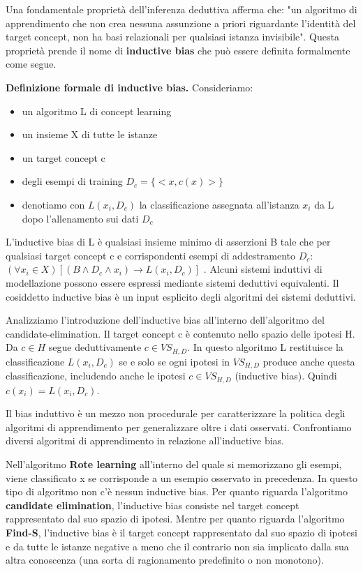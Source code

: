 \documentclass[a4paper]{extarticle}
\begin{document}
Una fondamentale proprietà dell'inferenza deduttiva afferma che: "un algoritmo di apprendimento che non crea nessuna assunzione a priori riguardante l'identità del target concept, non ha basi relazionali per qualsiasi istanza invisibile". Questa proprietà prende il nome di \textbf{inductive bias} che può essere definita formalmente come segue.

\textbf{Definizione formale di inductive bias.} Consideriamo:
\begin{itemize}
\item un algoritmo L di concept learning
\item un insieme X di tutte le istanze
\item un target concept c
\item degli esempi di training $D_c = \{ <x,c(x)>\}$
\item denotiamo con $L(x_i,D_c)$ la classificazione assegnata all'istanza $x_i$ da L dopo l'allenamento sui dati $D_c$
\end{itemize}

L'inductive bias di L è qualsiasi insieme minimo di asserzioni B tale che per qualsiasi target concept c e corrispondenti esempi di addestramento $D_c$: $(\forall x_i \in X) [( B \wedge D_c \wedge x_i ) \rightarrow L(x_i,D_c)]$ . Alcuni sistemi induttivi di modellazione possono essere espressi mediante sistemi deduttivi equivalenti. Il cosiddetto inductive bias è un input esplicito degli algoritmi dei sistemi deduttivi.

Analizziamo l'introduzione dell'inductive bias all'interno dell'algoritmo del candidate-elimination. Il target concept c è contenuto nello spazio delle ipotesi H. Da $c \in H$ segue deduttivamente $ c \in  VS_{H,D}$. In questo algoritmo L restituisce la classificazione $L(x_i,D_c)$ se e solo se ogni ipotesi in $VS_{H,D}$ produce anche questa classificazione, includendo anche le ipotesi $c \in VS_{H,D}$ (inductive bias). Quindi $c(x_i)=L(x_i,D_c)$.

Il bias induttivo è un mezzo non procedurale per caratterizzare la politica degli algoritmi di apprendimento per generalizzare oltre i dati osservati. Confrontiamo diversi algoritmi di apprendimento in relazione all'inductive bias. 

Nell'algoritmo \textbf{Rote learning} all'interno del quale si memorizzano gli esempi, viene classificato x se corrisponde a un esempio osservato in precedenza. In questo tipo di algoritmo non c'è nessun inductive bias. Per quanto riguarda l'algoritmo \textbf{candidate elimination}, l'inductive bias consiste nel target concept rappresentato dal suo spazio di ipotesi. Mentre per quanto riguarda l'algoritmo \textbf{Find-S}, l'inductive bias è il target concept rappresentato dal suo spazio di ipotesi e da tutte le istanze negative a meno che il contrario non sia implicato dalla sua altra conoscenza (una sorta di ragionamento predefinito o non monotono). 
\end{document}
